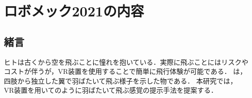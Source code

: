\chapter[ロボメック2021の内容]%
        {ロボメック2021の内容}
    
    \section{緒言}

    ヒトは古くから空を飛ぶことに憧れを抱いている．実際に飛ぶことにはリスクやコストが伴うが，VR装置を使用することで簡単に飛行体験が可能である．
    は，四肢から独立した翼で羽ばたいて飛ぶ様子を示した物である．
    本研究では，
    VR装置を用いてのように羽ばたいて飛ぶ感覚の提示手法を提案する．

   
        

